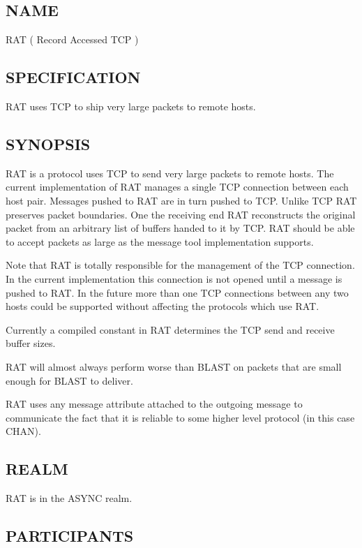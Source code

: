 
%
%

\subsection*{NAME}
\label{RAT}

\noindent RAT ( Record Accessed TCP )

\subsection*{SPECIFICATION}

\noindent
RAT uses TCP to ship very large packets to remote hosts. 

\subsection*{SYNOPSIS}
RAT is a protocol uses TCP to send very large packets to remote hosts. The 
current implementation of RAT manages a single TCP connection between 
each host pair. Messages pushed to RAT are in turn pushed to TCP. Unlike 
TCP RAT preserves packet boundaries. One the receiving end RAT 
reconstructs the original packet from an arbitrary list of buffers handed 
to it by TCP. RAT should be able to accept packets as large as the message 
tool implementation supports. 

Note that RAT is totally responsible for the management of the TCP 
connection. In the current implementation this connection is not opened 
until a message is pushed to RAT. In the future more than one TCP 
connections between any two hosts could be supported without affecting 
the protocols which use RAT. 

Currently  a compiled constant in RAT determines the TCP send and 
receive buffer sizes. 

RAT will almost always perform worse than BLAST on packets that are 
small enough for BLAST to deliver. 

RAT uses any message attribute attached to the outgoing message 
to communicate the fact that it is reliable to some higher level protocol
(in this case CHAN). 

\noindent 
\subsection*{REALM}

RAT is in the ASYNC realm.

\subsection*{PARTICIPANTS}

